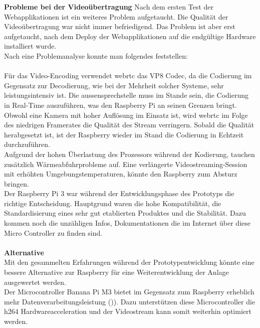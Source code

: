 \textbf{Probleme bei der Videoübertragung}
Nach dem ersten Test der Webapplikationen ist ein weiteres Problem aufgetaucht. Die Qualität der Videoübertragung war nicht immer befriedigend. Das Problem ist aber erst aufgetaucht, nach dem Deploy der Webapplikationen auf die endgültige Hardware installiert wurde.
\\
Nach eine Problemanalyse konnte man folgendes feststellen:
\\
\\
Für das Video-Encoding verwendet \gls{webrtc} das VP8 Codec, da die Codierung im Gegensatz zur Decodierung, wie bei der Mehrheit solcher Systeme, sehr leistungsintensiv ist. Die \gls{aussensprechstelle} muss im Stande sein, die Codierung in Real-Time auszuführen, was den Raspberry Pi an seinen Grenzen bringt. Obwohl eine Kamera mit hoher Auflösung im Einsatz ist, wird \gls{webrtc} im Folge des niedrigen Framerates die Qualität des Stream verringern. Sobald die Qualität herabgesetzt ist, ist der Raspberry wieder im Stand die Codierung in Echtzeit durchzuführen. 
\\
Aufgrund der hohen Überlastung des Prozessors während der Kodierung, tauchen zusätzlich Wärmeabfuhrprobleme auf. Eine verlängerte Videostreaming-Session mit erhöhten Umgebungstemperaturen, könnte den Raspberry zum Absturz bringen.
\\
Der Raspberry Pi 3 war während der Entwicklungsphase des Prototyps die richtige Entscheidung. Hauptgrund waren die hohe Kompatibilität, die Standardisierung eines sehr gut etablierten Produktes und die Stabilität. Dazu kommen noch die unzähligen Infos, Dokumentationen die im Internet über diese Micro Controller zu finden sind.
\\
\\
\textbf{Alternative}
\\ 
Mit den gesammelten Erfahrungen während der Prototypentwicklung könnte eine bessere Alternative zur Raspberry für eine Weiterentwicklung der Anlage ausgewertet werden.
\\
Der Microcontroller Banana Pi M3 bietet im Gegensatz zum Raspberry erheblich mehr Datenverarbeitungsleistung ()). Dazu unterstützen diese Microcontroller die \gls{h264} Hardwareacceleration und der Videostream kann somit weiterhin optimiert werden.

